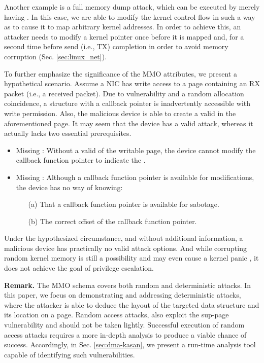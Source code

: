 Another example is a full memory dump attack, which can be executed by merely having \oportunity. In this case, we are able to modify the kernel control flow in such a way as to cause it to map arbitrary kernel addresses. In order to achieve this, an attacker needs to modify a kernel pointer once before it is mapped and, for a second time before send (i.e., TX) completion in order to avoid memory corruption (Sec. \ref{sec:linux_net}). 

To further emphasize the significance of the MMO attributes, we present a hypothetical scenario. Assume a NIC has write access to a page containing an RX packet (i.e., a received packet). Due to \subpage{} vulnerability and a random allocation coincidence, a structure with a callback pointer is inadvertently accessible with write permission. Also, the malicious device is able to create a valid \mabaf{} in the aforementioned page. It may seem that the device has a valid attack, whereas it actually lacks two essential prerequisites.

\begin{itemize}
    \item Missing \means: Without a valid \kva{} of the writable page, the device cannot modify the callback function pointer to indicate the \mabaf.
    \item Missing \oportunity: Although a callback function pointer is available for modifications, the device has no way of knowing: 
    \begin{enumerate}
        \item[(a)] That a callback function pointer is available for sabotage.
        \item[(b)] The correct offset of the callback function pointer.
    \end{enumerate}
\end{itemize}

Under the hypothesized circumstance, and without additional information, a malicious device has practically no valid attack options. 
And while corrupting random kernel memory is still a possibility and may even cause a kernel panic \cite{MMT16}, it does not achieve the goal of privilege escalation.


\smallskip
\noindent\textbf{Remark.} The MMO schema covers both random and deterministic attacks. In this paper, we focus on demonstrating and addressing deterministic attacks, where the attacker is able to deduce the layout of the targeted data structure and its location on a page. Random access attacks, also exploit the sup-page vulnerability and should not be taken lightly. Successful execution of random access attacks requires a more in-depth analysis to produce a viable chance of success. Accordingly, in Sec. \ref{sec:dma-kasan}, we present a run-time analysis tool capable of identifying such vulnerabilities. 

